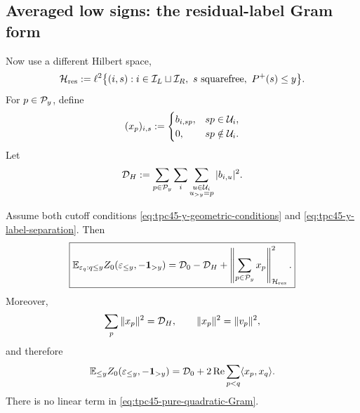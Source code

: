 \subsection{Averaged low signs: the residual-label Gram form}

Now use a different Hilbert space,
\begin{equation}
 \mathcal H_{\rm res}
 :=\ell^2\bigl\{(i,s):
 i\in\mathcal I_L\sqcup\mathcal I_R,
 \ s\text{ squarefree},\ P^{+}(s)\le y\bigr\}.
 \label{eq:tpc45-residual-Hilbert-space}
\end{equation}
For \(p\in\mathcal P_y\), define
\begin{equation}
 (x_p)_{i,s}:=
 \begin{cases}
  b_{i,sp},&sp\in\mathcal U_i,\\
  0,&sp\notin\mathcal U_i.
 \end{cases}
 \label{eq:tpc45-xp}
\end{equation}
Let
\begin{equation}
 \mathcal D_H:=\sum_{p\in\mathcal P_y}\sum_i
        \sum_{\substack{u\in\mathcal U_i\\u_{>y}=p}}|b_{i,u}|^2.
 \label{eq:tpc45-DH}
\end{equation}

\begin{theorem}
\label{thm:tpc45-low-averaged-Gram}
Assume both cutoff conditions
\eqref{eq:tpc45-y-geometric-conditions} and
\eqref{eq:tpc45-y-label-separation}.  Then
\begin{equation}
 \boxed{
 \mathbb E_{\varepsilon_q:q\le y}
 Z_0(\varepsilon_{\le y},-\mathbf 1_{>y})
 =\mathcal D_0-\mathcal D_H+
  \left\|\sum_{p\in\mathcal P_y}x_p\right\|_{\mathcal H_{\rm res}}^2.}
 \label{eq:tpc45-low-averaged-Gram}
\end{equation}
Moreover,
\begin{equation}
 \sum_p\|x_p\|^2=\mathcal D_H,
 \qquad
 \|x_p\|^2=\|v_p\|^2,
 \label{eq:tpc45-xp-diagonal}
\end{equation}
and therefore
\begin{equation}
 \mathbb E_{\le y}Z_0(\varepsilon_{\le y},-\mathbf 1_{>y})
 =\mathcal D_0+2\operatorname{Re}
  \sum_{p<q}\langle x_p,x_q\rangle.
 \label{eq:tpc45-pure-quadratic-Gram}
\end{equation}
There is no linear term in \eqref{eq:tpc45-pure-quadratic-Gram}.
\end{theorem}

